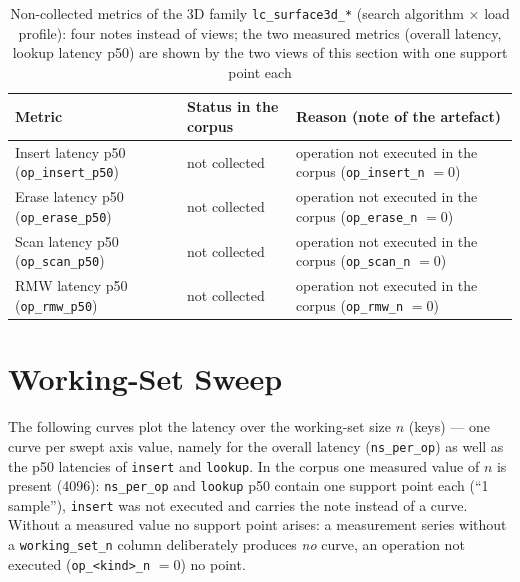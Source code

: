 \begin{table}[!htbp]
\centering
\small
\begin{tabular}{@{}>{\raggedright\arraybackslash}p{4.4cm}>{\raggedright\arraybackslash}p{3.0cm}>{\raggedright\arraybackslash}p{7.0cm}@{}}
\toprule
Metric & Status in the corpus & Reason (note of the artefact) \\
\midrule
Insert latency p50 (\texttt{op\_insert\_p50}) & not collected & operation not executed in the corpus (\texttt{op\_insert\_n} $= 0$) \\
Erase latency p50 (\texttt{op\_erase\_p50}) & not collected & operation not executed in the corpus (\texttt{op\_erase\_n} $= 0$) \\
Scan latency p50 (\texttt{op\_scan\_p50}) & not collected & operation not executed in the corpus (\texttt{op\_scan\_n} $= 0$) \\
RMW latency p50 (\texttt{op\_rmw\_p50}) & not collected & operation not executed in the corpus (\texttt{op\_rmw\_n} $= 0$) \\
\bottomrule
\end{tabular}
\caption{Non-collected metrics of the 3D family \texttt{lc\_surface3d\_*} (search algorithm $\times$
load profile): four notes instead of views; the two measured metrics (overall latency, lookup
latency p50) are shown by the two views of this section with one support point each}%
\label{tab:t3:surfaces3d}
\end{table}
\fi

\section{Working-Set Sweep}\label{sec:measurements:working-set-sweep}

The following curves plot the latency over the working-set size $n$ (keys) --- one curve per swept
axis value, namely for the overall latency (\texttt{ns\_per\_op}) as well as the p50 latencies of
\texttt{insert} and \texttt{lookup}. In the corpus one measured value of $n$ is present (4096):
\texttt{ns\_per\_op} and \texttt{lookup} p50 contain one support point each (\enquote{1 sample}),
\texttt{insert} was not executed and carries the note instead of a curve. Without a measured value
no support point arises: a measurement series without a \texttt{working\_set\_n} column deliberately
produces \emph{no} curve, an operation not executed (\texttt{op\_<kind>\_n} $= 0$) no point.

